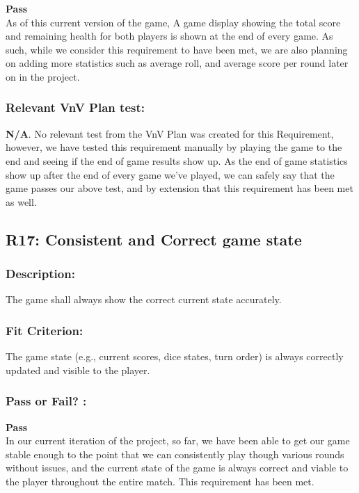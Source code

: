 \documentclass[12pt, titlepage]{article}
\begin{document}
 \noindent \textbf{Pass}\\
 
 \noindent As of this current version of the game, A game display showing the total score and remaining health for both players is shown at the end of every game. As such, while we consider this requirement to have been met, we are also planning on adding more statistics such as average roll, and average score per round later on in the project.
 
 \subsubsection*{Relevant VnV Plan test: } \textbf{N/A}. No relevant test from the VnV Plan was created for this Requirement, however, we have tested this requirement manually by playing the game to the end and seeing if the end of game results show up. As the end of game statistics show up after the end of every game we've played, we can safely say that the game passes our above test, and by extension that this requirement has been met as well.


\subsection{R17: Consistent and Correct game state} 
\label{R17} 

\subsubsection*{Description:} The game shall always show the correct current state accurately.

\subsubsection*{Fit Criterion:}The game state (e.g., current scores, dice states, turn order) is always correctly updated and visible to the player.

\subsubsection*{Pass or Fail? :} 

 \noindent \textbf{Pass}\\
 
 \noindent In our current iteration of the project, so far, we have been able to get our game stable enough to the point that we can consistently play though various rounds without issues, and the current state of the game is always correct and viable to the player throughout the entire match. This requirement has been met.
 
\end{document}
